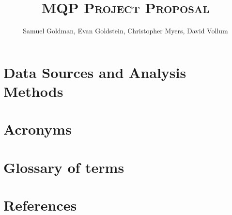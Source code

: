 \documentclass[12pt]{article}
\title{\scshape MQP Project Proposal}
\author{Samuel Goldman, Evan Goldstein, Christopher Myers, David Vollum}
\begin{document}
    
    \maketitle
    \newpage
    
    \tableofcontents\newpage
    \listoffigures
    \newpage
    
    \pagestyle{fancy}
    \onehalfspacing
    
    
    
    \newpage
    
    \newpage
    
    \newpage
    
    \section{Data Sources and Analysis Methods}
    
    
    
    
    
    
    
    \singlespacing
    \let\endsection\section
    \renewcommand{\section}[2]{}%
    
    \newpage
    \endsection{Acronyms}
    \printglossary[type=\acronymtype]
    
    \endsection{Glossary of terms}
    \printglossary
    
    \newpage
    \nocite{*}
    \endsection{References}
    \printbibliography
\end{document}
